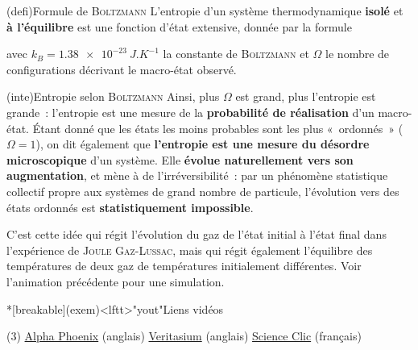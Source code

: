 \documentclass[../../main/main.tex]{subfiles}
\begin{document}
\begin{tcb*}(defi){Formule de \textsc{Boltzmann}}
	L'entropie d'un système thermodynamique \textbf{isolé} et \textbf{à
		l'équilibre} est une fonction d'état extensive, donnée par la formule
	\smallbreak
	\begin{isd}
		\vspace{-15pt}
		\psw{%
			\[
				\boxed{S = k_B \ln \Omega}
			\]
		}%
		\vspace{-25pt}
		\tcblower
		\vspace{-15pt}
		\psw{%
			\[
				\si{J.K^{-1}}
			\]
		}%
		\vspace{-25pt}
	\end{isd}
	avec $k_B = \SI{1.38e-23}{J.K^{-1}}$ la constante de \textsc{Boltzmann} et
	$\Omega$ le nombre de configurations décrivant le macro-état observé.
\end{tcb*}
\begin{tcb*}(inte){Entropie selon \textsc{Boltzmann}}
	Ainsi, plus $\Omega$ est grand, plus l'entropie est grande~: l'entropie est
	une mesure de la \textbf{probabilité de réalisation} d'un macro-état. Étant
	donné que les états les moins probables sont les plus «~ordonnés~» ($\Omega =
		1$), on dit également que \textbf{l'entropie est une mesure du désordre
		microscopique} d'un système.
	\bigbreak
	Elle \textbf{évolue naturellement vers son augmentation}, et mène à de
	l'irréversibilité~: par un phénomène statistique collectif propre aux systèmes
	de grand nombre de particule, l'évolution vers des états ordonnés est
	\textbf{statistiquement impossible}.
\end{tcb*}

C'est cette idée qui régit l'évolution du gaz de l'état initial à l'état final
dans l'expérience de \textsc{Joule Gaz-Lussac}, mais qui régit également
l'équilibre des températures de deux gaz de températures initialement
différentes. Voir l'animation précédente pour une simulation.

\begin{tcn}*[breakable](exem)<lftt>"yout"{Liens vidéos}
	\begin{tasks}[label=\bdmd](3)
		\task \href{https://www.youtube.com/watch?v=VCXqELB3UPg}{Alpha Phoenix}
		(anglais)
		\task \href{https://www.youtube.com/watch?v=DxL2HoqLbyA}{Veritasium}
		(anglais)
		\task \href{https://www.youtube.com/watch?v=flz_aSIJS0A}{Science Clic}
		(français)
	\end{tasks}
\end{tcn}
\end{document}
